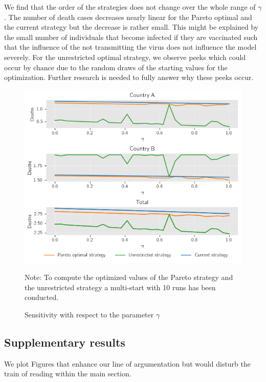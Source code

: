 We find that the order of the strategies does not change over the whole range of $\gamma$. The number of death cases decreases nearly linear for the Pareto optimal and the current strategy but the decrease is rather small. This might be explained by the small number of individuals that become infected if they are vaccinated such that the influence of the not transmitting the virus does not influence the model severely. For the unrestricted optimal strategy, we observe peeks which could occur by chance due to the random draws of the starting values for the optimization. Further research is needed to fully answer why these peeks occur.


\begin{figure}[h!]
\centering
\includegraphics[scale=0.59]{images/sensitivity_gamma.png}
\begin{flushleft}
\scriptsize{Note:} To compute the optimized values of the Pareto strategy and the unrestricted strategy a multi-start with 10 runs has been conducted.
\end{flushleft}
\caption{Sensitivity with respect to the parameter $\gamma$}
\label{fig:sensitivity_gamma}
\end{figure}


\clearpage


\subsection{Supplementary results}
We plot Figures that enhance our line of argumentation but would disturb the train of reading within the main section.

